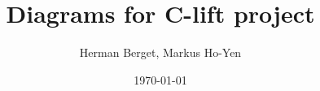 \author{Herman Berget, Markus Ho-Yen}
\title{Diagrams for C-lift project}
\date{\today}
\maketitle
\newpage
{}

